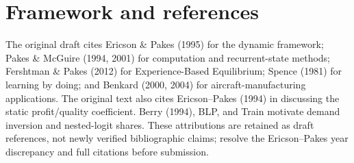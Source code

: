 \documentclass[11pt]{article}
\begin{document}
\section{Framework and references}
The original draft cites Ericson \& Pakes (1995) for the dynamic framework; Pakes \& McGuire (1994, 2001) for computation and recurrent-state methods; Fershtman \& Pakes (2012) for Experience-Based Equilibrium; Spence (1981) for learning by doing; and Benkard (2000, 2004) for aircraft-manufacturing applications. The original text also cites Ericson--Pakes (1994) in discussing the static profit/quality coefficient. Berry (1994), BLP, and Train motivate demand inversion and nested-logit shares. These attributions are retained as draft references, not newly verified bibliographic claims; resolve the Ericson--Pakes year discrepancy and full citations before submission.
\end{document}
